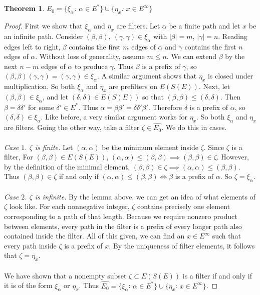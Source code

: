 \documentclass{article}
\newtheorem*{theorem}{Theorem}
\begin{document}
\begin{theorem} $\hat{E_0} = \{\xi_\alpha$: $\alpha \in E^*\} \cup \{\eta_x$: $x \in E^\infty\}$ \end{theorem}
\begin{proof}
First we show that $\xi_\alpha$ and $\eta_x$ are filters. Let $\alpha$ be a finite path and let $x$ be an infinite path.
Consider $(\beta, \beta), \ (\gamma, \gamma) \in \xi_\alpha$ with $|\beta| = m$, $|\gamma| = n$. 
Reading edges left to right, $\beta$ contains the first $m$ edges of $\alpha$ and $\gamma$ 
contains the first $n$ edges of $\alpha$. Without loss of generality, assume $m \leq n$. 
We can extend $\beta$ by the next $n - m$ edges of $\alpha$ to produce $\gamma$. Thus
$\beta$ is a prefix of $\gamma$, so $(\beta, \beta)(\gamma, \gamma) = (\gamma, \gamma) \in \xi_\alpha$.
A similar argument shows that $\eta_x$ is closed under multiplication. So both $\xi_\alpha$ and $\eta_x$ are prefilters
on $E(S(E))$. Next, let $(\beta, \beta) \in \xi_\alpha$, and let $(\delta, \delta) \in E(S(E))$ so that 
$(\beta, \beta) \leq (\delta, \delta)$. Then $\beta = \delta \delta'$ for some $\delta' \in E^*$. 
Thus $\alpha = \beta \beta' = \delta \delta' \beta'$. Therefore $\delta$ is a prefix of $\alpha$, so 
$(\delta, \delta) \in \xi_\alpha$. Like before, a very similar argument works for $\eta_x$. So both 
$\xi_\alpha$ and $\eta_x$ are filters. Going the other way, take a filter $\zeta \in \hat{E_0}$.
We do this in cases.
\\ \\
    \textit{Case $1$. $\zeta$ is finite.}
Let $(\alpha, \alpha)$ be the minimum element inside $\zeta$. Since $\zeta$ is a filter,
For $(\beta, \beta) \in E(S(E))$, $(\alpha, \alpha) \leq (\beta, \beta) \implies (\beta, \beta) \in \zeta$.
However, by the definition of the minimal element, $(\beta, \beta) \in \zeta \implies (\alpha, \alpha) \leq (\beta, \beta)$.
Thus $(\beta, \beta) \in \zeta$ if and only if $(\alpha, \alpha) \leq (\beta, \beta) \iff \beta$ is a prefix of $\alpha$. So $\zeta = \xi_\alpha$.
\\ \\
    \textit{Case $2$. $\zeta$ is infinite.}
By the lemma above, we can get an idea of what elements of $\zeta$ look like.
For each nonnegative integer, $\zeta$ contains precisely one element corresponding
to a path of that length. Because we require nonzero product between elements, every
path in the filter is a prefix of every longer path also contained inside the filter.
All of this given, we can find an $x \in E^\infty$ such that every path inside $\zeta$
is a prefix of $x$. By the uniqueness of filter elements, it follows that $\zeta = \eta_x$.
\\ \\
We have shown that a nonempty subset $\zeta \subset E(S(E))$ is a filter if and only if
it is of the form $\xi_\alpha$ or $\eta_x$. Thus $\hat{E_0} = \{\xi_\alpha$: $\alpha \in E^*\} \cup \{\eta_x$: $x \in E^\infty\}$.
\end{proof}
\end{document}
